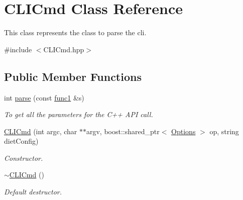 \hypertarget{classCLICmd}{
\section{CLICmd Class Reference}
\label{classCLICmd}
}


This class represents the class to parse the cli.  




{\ttfamily \#include $<$CLICmd.hpp$>$}

\subsection*{Public Member Functions}
\begin{DoxyCompactItemize}
\item 
int \hyperlink{classCLICmd_a867bca3ebdb191e644ddd4de0a4bee98}{parse} (const \hyperlink{Options_8hpp_a3e992ba9ff50fb8a17ae2d36ea9b3f80}{func1} \&s)
\begin{DoxyCompactList}\small\item\em To get all the parameters for the C++ API call. \item\end{DoxyCompactList}\item 
\hyperlink{classCLICmd_a1c8d00bf0bccf453e5c7dd4de93e2d43}{CLICmd} (int argc, char $\ast$$\ast$argv, boost::shared\_\-ptr$<$ \hyperlink{classOptions}{Options} $>$ op, string dietConfig)
\begin{DoxyCompactList}\small\item\em Constructor. \item\end{DoxyCompactList}\item 
\hypertarget{classCLICmd_a4084198949bd825f8b9440a10637963c}{
\hyperlink{classCLICmd_a4084198949bd825f8b9440a10637963c}{$\sim$CLICmd} ()}
\label{classCLICmd_a4084198949bd825f8b9440a10637963c}

\begin{DoxyCompactList}\small\item\em Default destructor. \item\end{DoxyCompactList}\end{DoxyCompactItemize}
